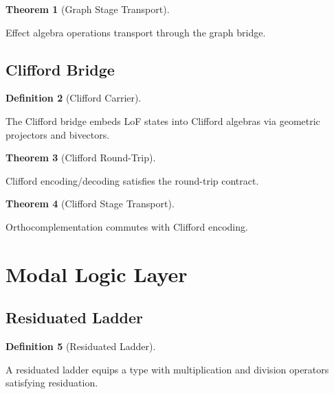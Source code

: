 \documentclass{amsart}
\theoremstyle{definition}
\newtheorem{definition}{Definition}[section]
\newtheorem{theorem}[definition]{Theorem}
\theoremstyle{remark}
\begin{document}
\begin{theorem}[Graph Stage Transport]
\label{thm:graph-stage}
\leanok
{}

Effect algebra operations transport through the graph bridge.
\end{theorem}

\subsection{Clifford Bridge}
\label{sec:clifford-bridge}

\begin{definition}[Clifford Carrier]
\label{def:clifford-carrier}
\uses{}

The Clifford bridge embeds LoF states into Clifford algebras via geometric projectors and bivectors.
\end{definition}

\begin{theorem}[Clifford Round-Trip]
\label{thm:clifford-rt}
\leanok
{}

Clifford encoding/decoding satisfies the round-trip contract.
\end{theorem}

\begin{theorem}[Clifford Stage Transport]
\label{thm:clifford-stage}
\leanok
{}

Orthocomplementation commutes with Clifford encoding.
\end{theorem}

\section{Modal Logic Layer}

\subsection{Residuated Ladder}
\label{sec:residuated-ladder}

\begin{definition}[Residuated Ladder]
\label{def:residuated-ladder}
\uses{}

A residuated ladder equips a type with multiplication and division operators satisfying residuation.
\end{definition}
\end{document}
